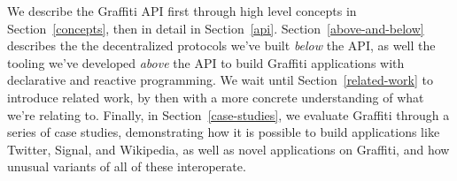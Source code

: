 We describe the Graffiti API
first through high level concepts in Section~\ref{concepts},
then in detail in Section~\ref{api}.
Section~\ref{above-and-below} describes the
the decentralized protocols we've built \emph{below} the API,
as well the tooling we've developed \emph{above} the API
to build Graffiti applications with declarative and reactive programming.
We wait until Section~\ref{related-work}
to introduce related work, by then with a more concrete
understanding of what we're relating to.
Finally, in Section~\ref{case-studies},
we evaluate Graffiti through a series of case studies, demonstrating
how it is possible to build applications like Twitter, Signal, and
Wikipedia, as well as novel applications on Graffiti, and how unusual
variants of all of these interoperate.






